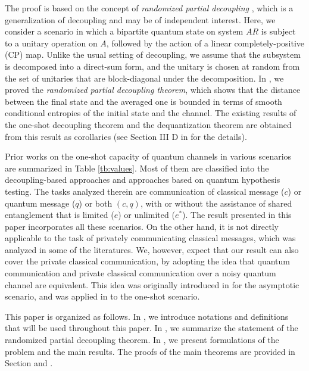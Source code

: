 \documentclass[journal]{IEEEtran}
\begin{document}
The proof is based on the concept of {\it randomized partial decoupling} \cite{wakakuwa2019one}, which is a generalization of decoupling and may be of independent interest.
Here, 
we consider a scenario in which a bipartite quantum state on system $AR$ is subject to a unitary operation on $A$, followed by the action of a linear completely-positive (CP) map. Unlike the usual setting of decoupling, we assume that
the subsystem is decomposed into a direct-sum form, and 
the unitary is chosen at random from the set of unitaries that are block-diagonal under the decomposition. 
In \cite{wakakuwa2019one}, we proved the {\it randomized partial decoupling theorem}, which shows that the distance between the final state and the averaged one is bounded in terms of smooth conditional entropies of the initial state and the channel.
The existing results of the one-shot decoupling theorem \cite{DBWR2010} and the dequantization theorem \cite{dupuis2014decoupling}
are obtained from this result as corollaries (see Section III D in \cite{wakakuwa2019one} for the details).

Prior works on the one-shot capacity of quantum channels in various scenarios are summarized in Table \ref{tb:values}.
  Most of them are classified into the decoupling-based approaches and approaches based on quantum hypothesis testing. 
  The tasks analyzed therein are communication of classical message ($c$) or quantum message ($q$) or both $(c,q)$, with or without the assistance of shared entanglement that is limited ($e$) or unlimited ($e^*$).
    The result presented in this paper incorporates all these scenarios.
On the other hand, it is not directly applicable to the task of privately communicating classical messages, which was analyzed in some of the literatures.
We, however, expect that our result can also cover the private classical communication,
by adopting the idea that quantum communication and private classical communication over a noisy quantum channel are equivalent.
This idea was originally introduced in \cite{devetak2005private} for the asymptotic scenario, and was applied in \cite{salek2019one} to the one-shot scenario.



This paper is organized as follows. 
In , we introduce notations and definitions that will be used throughout this paper. 
In , we summarize the statement of the randomized partial decoupling theorem.
In , we present formulations of the problem and the main results. 
The proofs of the main theorems are provided in Section  and .
\end{document}
